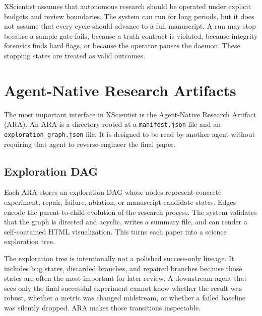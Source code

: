 \documentclass[11pt]{article}
\begin{document}
XScientist assumes that autonomous research should be operated under explicit
budgets and review boundaries. The system can run for long periods, but it
does not assume that every cycle should advance to a full manuscript. A run
may stop because a sample gate fails, because a truth contract is violated,
because integrity forensics finds hard flags, or because the operator pauses
the daemon. These stopping states are treated as valid outcomes.

\section{Agent-Native Research Artifacts}

The most important interface in XScientist is the Agent-Native Research
Artifact (ARA). An ARA is a directory rooted at a \texttt{manifest.json} file
and an \texttt{exploration\_graph.json} file. It is designed to be read by
another agent without requiring that agent to reverse-engineer the final
paper.

\subsection{Exploration DAG}

Each ARA stores an exploration DAG whose nodes represent concrete experiment,
repair, failure, ablation, or manuscript-candidate states. Edges encode the
parent-to-child evolution of the research process. The system validates that
the graph is directed and acyclic, writes a summary file, and can render a
self-contained HTML visualization. This turns each paper into a science
exploration tree.

The exploration tree is intentionally not a polished success-only lineage.
It includes bug states, discarded branches, and repaired branches because
those states are often the most important for later review. A downstream agent
that sees only the final successful experiment cannot know whether the result
was robust, whether a metric was changed midstream, or whether a failed
baseline was silently dropped. ARA makes those transitions inspectable.
\end{document}

